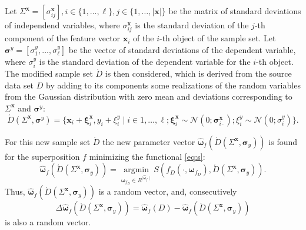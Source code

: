 \documentclass[11pt,a4paper]{article}
\theoremstyle{definition}
\begin{document}
Let
$\Sigma^{\mathbf{x}} = [ \sigma^{\mathbf{x}}_{ij} ], i \in \{ 1, \dots, \ell \}, j \in \{ 1, \dots, | \mathbf{x} | \}$
be the matrix of
standard deviations of independend variables, where $\sigma^{\mathbf{x}}_{ij}$
is the standard deviation of the $j$-th component of the feature vector
$\mathbf{x}_i$ of the $i$-th object of the sample set. Let
$\boldsymbol{\sigma}^y = [ \sigma^y_1, \dots, \sigma^y_\ell ]$
be the vector of standard deviations of the dependent variable, where $\sigma^y_i$
is the standard deviation of the dependent variable for the $i$-th object.
The modified sample set $\acute{D}$ is then considered, which is derived from the
source data set $D$ by adding to its components some realizations of the
random variables from the Gaussian distribution with zero mean and 
deviations corresponding to $\Sigma^{\mathbf{x}}$ and $\boldsymbol{\sigma}^y$:
\begin{equation}
  \acute{D}(\Sigma^{\mathbf{x}}, \boldsymbol{\sigma}^y) = \{ \mathbf{x}_i + \boldsymbol{\xi}^{\mathbf{x}}_i, y_i + \xi^y_i \mid i \in 1, \dots, \ell; \boldsymbol{\xi}^{\mathbf{x}}_i \sim \mathcal{N}(0; \boldsymbol{\sigma}^{\mathbf{x}}_{i \cdot}); \xi^y_i \sim \mathcal{N}(0; \sigma^y_i) \}.
  \label{eq:d_acute}
\end{equation}

For this new sample set $\acute{D}$ the new parameter vector $\hat{\boldsymbol{\omega}}_f (\acute{D} (\Sigma^{\mathbf{x}}, \boldsymbol{\sigma}_y))$
is found for the superposition $f$ minimizing the functional \eqref{eq:s}:
\begin{equation}
  \hat{\boldsymbol{\omega}}_f (\acute{D} (\Sigma^{\mathbf{x}}, \boldsymbol{\sigma}_y)) = \mathop{\arg \min}\limits_{\boldsymbol{\omega}_{f_D} \in R^{\mid \hat{\boldsymbol{\omega}}_f \mid}} S (f_D (\cdot, \boldsymbol{\omega}_{f_D}), \acute{D} (\Sigma^{\mathbf{x}}, \boldsymbol{\sigma}_y)).
  \label{eq:hat_omega}
\end{equation}
Thus, $\hat{\boldsymbol{\omega}}_f (\acute{D} (\Sigma^{\mathbf{x}}, \boldsymbol{\sigma}_y))$ is
a random vector, and, consecutively
\[
  \Delta\hat{\boldsymbol{\omega}}_f(\acute{D} (\Sigma^{\mathbf{x}}, \boldsymbol{\sigma}_y) ) = \hat{\boldsymbol{\omega}}_f(D) - \hat{\boldsymbol{\omega}}_f (\acute{D} (\Sigma^{\mathbf{x}}, \boldsymbol{\sigma}_y))
\]
is also a random vector.
\end{document}
